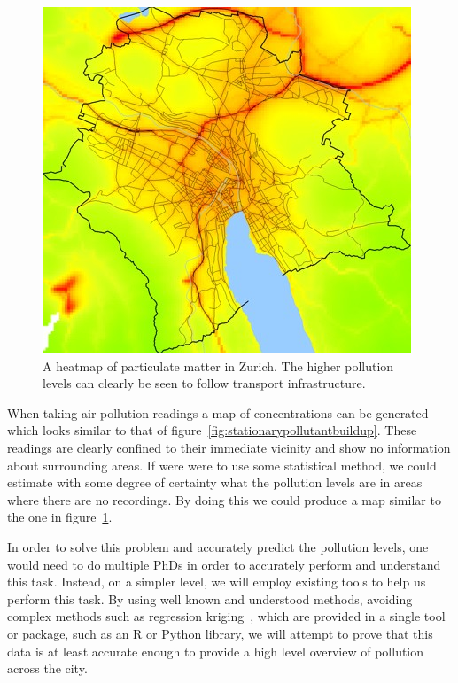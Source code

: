 \documentclass[12pt,a4paper,notitlepage]{article}
\begin{document}
\begin{figure}[H]
    \begin{center}
        \includegraphics[width=\textwidth]{../images/zurichpm.jpg}
        \caption{A heatmap of particulate matter in Zurich. The higher pollution levels can clearly be seen to follow transport infrastructure.~\cite{opensensezurich}}
        \label{fig:zurichheatmap}
    \end{center}
\end{figure}

When taking air pollution readings a map of concentrations can be generated which looks similar to that of figure~\ref{fig:stationarypollutantbuildup}. These readings are clearly confined to their immediate vicinity and show no information about surrounding areas. If were were to use some statistical method, we could estimate with some degree of certainty what the pollution levels are in areas where there are no recordings. By doing this we could produce a map similar to the one in figure~\ref{fig:zurichheatmap}.


In order to solve this problem and accurately predict the pollution levels, one would need to do multiple PhDs in order to accurately perform and understand this task. Instead, on a simpler level, we will employ existing tools to help us perform this task. By using well known and understood methods, avoiding complex methods such as regression kriging~\cite{regressionkriging}, which are provided in a single tool or package, such as an R or Python library, we will attempt to prove that this data is at least accurate enough to provide a high level overview of pollution across the city. 
\end{document}
